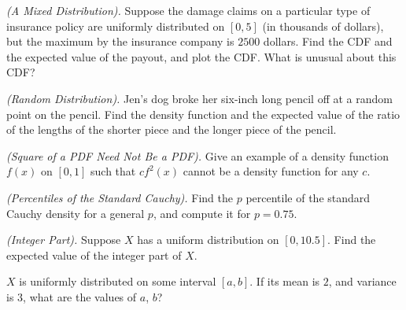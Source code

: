 \begin{problem}[Handout 12, \# 18]
  \emph{(A Mixed Distribution).} Suppose the damage claims on a particular
  type of insurance policy are uniformly distributed on \([0,5]\) (in
  thousands of dollars), but the maximum by the insurance company is
  \(2500\) dollars. Find the CDF and the expected value of the payout, and
  plot the CDF. What is unusual about this CDF?
\end{problem}
\begin{solution}

\end{solution}
\newpage

\begin{problem}[Handout 12, \# 19]
  \emph{(Random Distribution).} Jen's dog broke her six-inch long pencil
  off at a random point on the pencil. Find the density function and the
  expected value of the ratio of the lengths of the shorter piece and the
  longer piece of the pencil.
\end{problem}
\begin{solution}

\end{solution}
\newpage

\begin{problem}[Handout 12, \# 20]
  \emph{(Square of a PDF Need Not Be a PDF).} Give an example of a density
  function \(f(x)\) on \([0,1]\) such that \(cf^2(x)\) cannot be a density
  function for any \(c\).
\end{problem}
\begin{solution}

\end{solution}
\newpage

\begin{problem}[Handout 12, \# 21]
  \emph{(Percentiles of the Standard Cauchy).} Find the \(p\)
  percentile of the standard Cauchy density for a general \(p\), and
  compute it for \(p=0.75\).
\end{problem}
\begin{solution}

\end{solution}
\newpage

\begin{problem}[Handout 12, \# 22]
  \emph{(Integer Part).} Suppose \(X\) has a uniform distribution on
  \([0,10.5]\). Find the expected value of the integer part of \(X\).
\end{problem}
\begin{solution}

\end{solution}
\newpage

\begin{problem}[Handout 12, \# 23]
  \(X\) is uniformly distributed on some interval \([a,b]\). If its mean is
  \(2\), and variance is \(3\), what are the values of \(a\), \(b\)?
\end{problem}
\begin{solution}

\end{solution}

